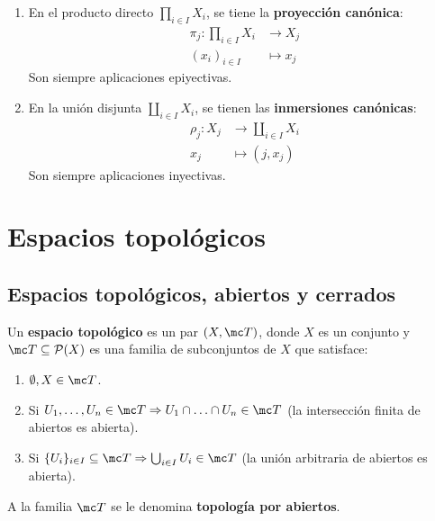 \begin{enumerate}
    \item En el producto directo $\prod_{i \in I} X_i$, se tiene la \textbf{proyección canónica}:
    $$
        \begin{aligned}
            \pi_j \colon \prod_{i \in I} X_i &\longrightarrow X_j \text{} \\
            (x_i)_{i \in I} &\longmapsto x_j \text{}
        \end{aligned}
    $$
    Son siempre aplicaciones epiyectivas.

    \item En la unión disjunta $\coprod_{i \in I} X_i$, se tienen las \textbf{inmersiones canónicas}:
    $$
        \begin{aligned}
            \rho_j \colon X_j &\longrightarrow \coprod_{i \in I} X_i \text{} \\
            x_j &\longmapsto (j, x_j) \text{}
        \end{aligned}
    $$
    Son siempre aplicaciones inyectivas.
\end{enumerate}





























\chapter{Espacios topol\'ogicos}\section{Espacios topológicos, abiertos y cerrados}

\begin{defi}
Un \textbf{espacio topológico} es un par \((X, \mc T)\), donde \(X\) es un conjunto y \(\mc T \subseteq \mathcal{P}(X)\) es una familia de subconjuntos de \(X\) que satisface:
\begin{enumerate}
    \item[\textbf{1)}] \(\emptyset, X \in \mc T\).
    \item[\textbf{2)}] Si \(U_1, \ldots, U_n \in \mc T \Rightarrow U_1 \cap \ldots \cap U_n \in \mc T\) (la intersección finita de abiertos es abierta).
    \item[\textbf{3)}] Si \(\{U_i\}_{i \in I} \subseteq \mc T \Rightarrow \bigcup_{i \in I} U_i \in \mc T\) (la unión arbitraria de abiertos es abierta).
\end{enumerate}
A la familia \(\mc T\) se le denomina \textbf{topología por abiertos}.
\end{defi}

